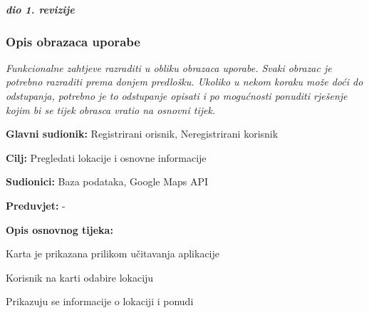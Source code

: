 				\textbf{\textit{dio 1. revizije}}
				
				\subsubsection{Opis obrazaca uporabe}
					\textit{Funkcionalne zahtjeve razraditi u obliku obrazaca uporabe. Svaki obrazac je potrebno razraditi prema donjem predlošku. Ukoliko u nekom koraku može doći do odstupanja, potrebno je to odstupanje opisati i po mogućnosti ponuditi rješenje kojim bi se tijek obrasca vratio na osnovni tijek.}\\
					

					\noindent {}
					\begin{packed_item}
	
						\item \textbf{Glavni sudionik: }Registrirani orisnik, Neregistrirani korisnik
						\item  \textbf{Cilj:} Pregledati lokacije i osnovne informacije
						\item  \textbf{Sudionici:} Baza podataka, Google Maps API
						\item  \textbf{Preduvjet:} -
						\item  \textbf{Opis osnovnog tijeka:}
						
						\item[] \begin{packed_enum}
	
							\item Karta je prikazana prilikom učitavanja aplikacije
							\item Korisnik na karti odabire lokaciju
							\item Prikazuju se informacije o lokaciji i ponudi

						\end{packed_enum}
						
					\end{packed_item}
					
